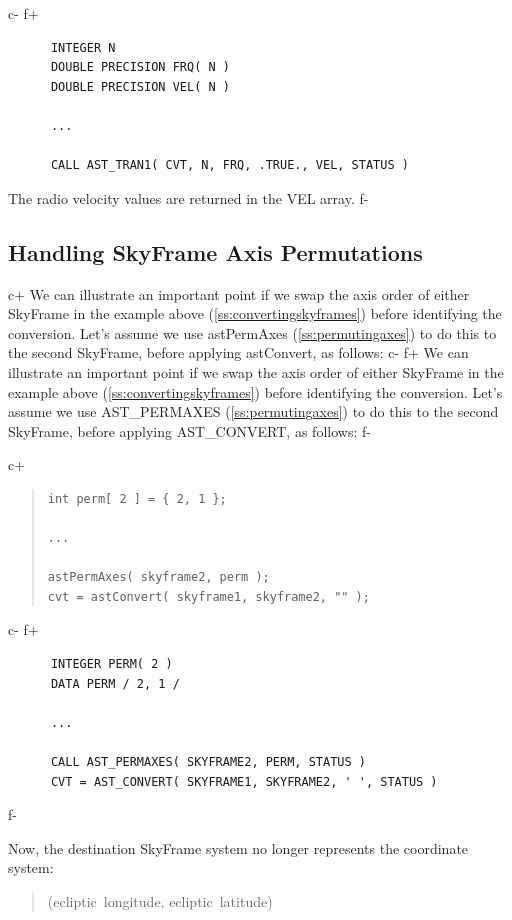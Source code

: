 \documentclass[twoside,11pt]{article}
\newcommand{\secref}[1]{\S\ref{#1}}
\renewcommand{\secref}[1]{\ref{#1}}
\begin{document}
c-
f+
\small
\begin{verbatim}
      INTEGER N
      DOUBLE PRECISION FRQ( N )
      DOUBLE PRECISION VEL( N )

      ...

      CALL AST_TRAN1( CVT, N, FRQ, .TRUE., VEL, STATUS )
\end{verbatim}
\normalsize

The radio velocity values are returned in the VEL array.
f-

\subsection{\label{ss:convertingpermutedaxes}Handling SkyFrame Axis Permutations}

c+
We can illustrate an important point if we swap the axis order of
either SkyFrame in the example above (\secref{ss:convertingskyframes})
before identifying the conversion. Let's assume we use astPermAxes
(\secref{ss:permutingaxes}) to do this to the second SkyFrame, before
applying astConvert, as follows:
c-
f+
We can illustrate an important point if we swap the axis order of
either SkyFrame in the example above (\secref{ss:convertingskyframes})
before identifying the conversion. Let's assume we use AST\_PERMAXES
(\secref{ss:permutingaxes}) to do this to the second SkyFrame, before
applying AST\_CONVERT, as follows:
f-

c+
\begin{quote}
\small
\begin{verbatim}
int perm[ 2 ] = { 2, 1 };

...

astPermAxes( skyframe2, perm );
cvt = astConvert( skyframe1, skyframe2, "" );
\end{verbatim}
\normalsize
\end{quote}
c-
f+
\small
\begin{verbatim}
      INTEGER PERM( 2 )
      DATA PERM / 2, 1 /

      ...

      CALL AST_PERMAXES( SKYFRAME2, PERM, STATUS )
      CVT = AST_CONVERT( SKYFRAME1, SKYFRAME2, ' ', STATUS )
\end{verbatim}
\normalsize
f-

Now, the destination SkyFrame system no longer represents the
coordinate system:

\begin{quote}
(ecliptic~longitude, ecliptic~latitude)
\end{quote}
\end{document}
